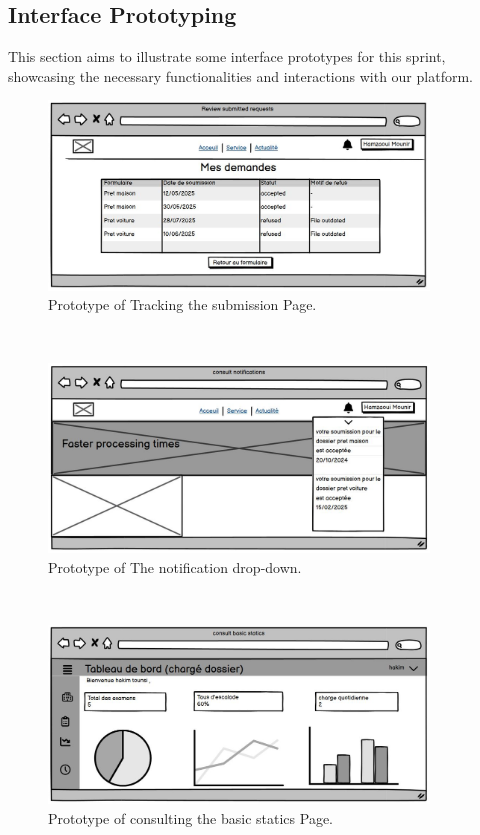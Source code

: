 \subsection{Interface Prototyping}
This section aims to illustrate some interface prototypes for this sprint, showcasing the necessary functionalities and interactions with our platform.
 \begin{figure}[h]
    \centering
    \includegraphics[width=0.9\textwidth]{figures/Tracksubstatus.JPG} 
    \caption{Prototype of Tracking the submission Page.}
\end{figure}\
 \begin{figure}[h]
    \centering
    \includegraphics[width=0.9\textwidth]{figures/notifications.JPG}  
    \caption{Prototype of The notification drop-down.}
\end{figure}\
 \begin{figure}[h]
    \centering
    \includegraphics[width=0.9\textwidth]{figures/consult basic statics.JPG} 
    \caption{Prototype of consulting the basic statics Page.}
\end{figure}\

